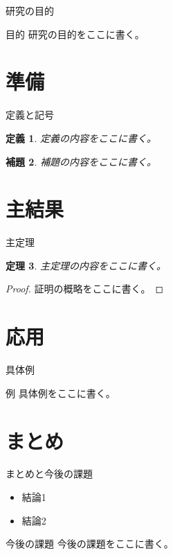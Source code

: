 \documentclass[dvipdfmx,12pt,aspectratio=169]{beamer}
\newtheorem{thm}{定理}
\newtheorem{dfn}[thm]{定義}
\newtheorem{lem}[thm]{補題}
\begin{document}
\begin{frame}{研究の目的}
\begin{block}{目的}
研究の目的をここに書く。
\end{block}
\end{frame}

\section{準備}

\begin{frame}{定義と記号}
\begin{dfn}
定義の内容をここに書く。
\end{dfn}

\begin{lem}
補題の内容をここに書く。
\end{lem}
\end{frame}

\section{主結果}

\begin{frame}{主定理}
\begin{thm}
主定理の内容をここに書く。
\end{thm}

\pause

\begin{proof}
証明の概略をここに書く。
\end{proof}
\end{frame}

\section{応用}

\begin{frame}{具体例}
\begin{exampleblock}{例}
具体例をここに書く。
\end{exampleblock}
\end{frame}

\section{まとめ}

\begin{frame}{まとめと今後の課題}
\begin{itemize}
  \item 結論1
  \item 結論2
\end{itemize}

\begin{alertblock}{今後の課題}
今後の課題をここに書く。
\end{alertblock}
\end{frame}
\end{document}
